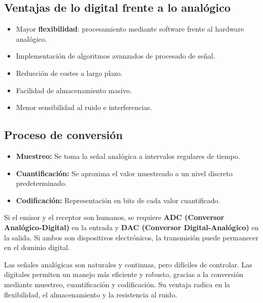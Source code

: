 \documentclass[11pt,a4paper]{article}
\begin{document}
\subsection{Ventajas de lo digital frente a lo analógico}
\begin{ChecklistBox}
\begin{itemize}
  \item Mayor \textbf{flexibilidad}: procesamiento mediante software frente al hardware analógico.
  \item Implementación de algoritmos avanzados de procesado de señal.
  \item Reducción de costes a largo plazo.
  \item Facilidad de almacenamiento masivo.
  \item Menor sensibilidad al ruido e interferencias.
\end{itemize}
\end{ChecklistBox}

\subsection{Proceso de conversión}
\begin{itemize}
  \item \textbf{Muestreo:} Se toma la señal analógica a intervalos regulares de tiempo.
  \item \textbf{Cuantificación:} Se aproxima el valor muestreado a un nivel discreto predeterminado.
  \item \textbf{Codificación:} Representación en bits de cada valor cuantificado.
\end{itemize}

\begin{NotaBox}
Si el emisor y el receptor son humanos, se requiere \textbf{ADC (Conversor Analógico-Digital)} en la entrada y \textbf{DAC (Conversor Digital-Analógico)} en la salida.
Si ambos son dispositivos electrónicos, la transmisión puede permanecer en el dominio digital.
\end{NotaBox}

\begin{ResumenBox}
Las señales analógicas son naturales y continuas, pero difíciles de controlar.
Las digitales permiten un manejo más eficiente y robusto, gracias a la conversión mediante muestreo, cuantificación y codificación.
Su ventaja radica en la flexibilidad, el almacenamiento y la resistencia al ruido.
\end{ResumenBox}
\end{document}

